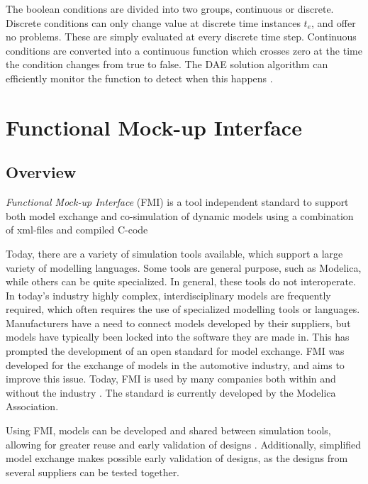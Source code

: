 \documentclass[\rootfolder/main.tex]{subfiles}
\begin{document}
The boolean conditions are divided into two groups, continuous or discrete.
Discrete conditions can only change value at discrete time instances $t_{e}$, and offer no problems.
These are simply evaluated at every discrete time step.
Continuous conditions are converted into a continuous function which crosses zero at the time the condition changes from true to false.
The DAE solution algorithm can efficiently monitor the function to detect when this happens \cite{openmodelica.org:lundvall:sims:2005}.

\section{Functional Mock-up Interface}

\subsection{Overview}

\begin{displayquote} \emph{Functional Mock-up Interface} (FMI) is a tool independent standard to support both model exchange and co-simulation of dynamic models using a combination of xml-files and compiled C-code
\end{displayquote}

Today, there are a variety of simulation tools available, which support a large variety of modelling languages.
Some tools are general purpose, such as Modelica, while others can be quite specialized.
In general, these tools do not interoperate.
In today's industry highly complex, interdisciplinary models are frequently required, which often requires the use of specialized modelling tools or languages.
Manufacturers have a need to connect models developed by their suppliers, but models have typically been locked into the software they are made in.  This has prompted the development of an open standard for model exchange.
FMI was developed for the exchange of models in the automotive industry, and aims to improve this issue.
Today, FMI is used by many companies both within and without the industry \cite{fmispecification}.
The standard is currently developed by the Modelica Association.

Using FMI, models can be developed and shared between simulation tools, allowing for greater reuse and early validation of designs \cite{Blochwitz2011}.
Additionally, simplified model exchange makes possible early validation of designs, as the designs from several suppliers can be tested together.
\end{document}
